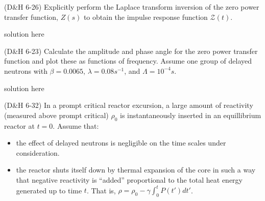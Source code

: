 \documentclass[11pt,addpoints,answers]{exam}
\begin{document}
\begin{questions}
        \question[20] (D\&H 6-26) Explicitly perform the Laplace transform 
        inversion of the zero power transfer function, $Z(s)$ to obtain the 
        impulse response function $\mathscr{Z}(t)$.
                \begin{solution}
                        solution here
                \end{solution}
       
        \question[30] (D\&H 6-23) Calculate the amplitude and phase angle for the 
        zero power transfer function and plot these as functions of frequency. 
        Assume one group of delayed neutrons with $\beta = 0.0065$, $\lambda = 
        0.08s^{-1}$, and $\Lambda = 10^{-4}s$.
                \begin{solution}
                        solution here
                \end{solution}
       
        \question[10] (D\&H 6-32) In a prompt critical reactor excursion, a 
        large amount of reactivity (measured above prompt critical) $\rho_0$ is 
        instantaneously inserted in an equillibrium reactor at $t=0$. Assume 
        that:
        \begin{itemize}
                \item the effect of delayed neutrons is negligible on the time 
                        scales under consideration.
                \item the reactor shuts itself down by thermal expansion of the 
                        core in such a way that negative reactivity is 
                        ``added'' proportional to the total heat energy 
                        generated up to time $t$. That is, $\rho = \rho_0 - 
                        \gamma\int_0^t{P(t')dt'}$. 
        \end{itemize}


\end{questions}
\end{document}
